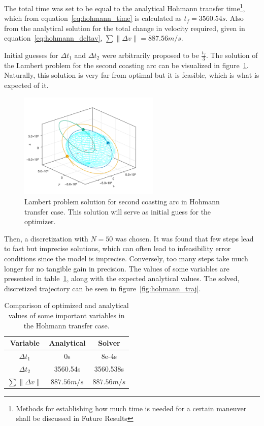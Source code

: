 The total time was set to be equal to the analytical Hohmann transfer time\footnote{Methods for establishing how much time is needed for a certain maneuver shall be discussed in Future Results}, which from equation~\eqref{eq:hohmann_time} is calculated as \(t_f = 3560.54s\). Also from the analytical solution for the total change in velocity required, given in equation~\eqref{eq:hohmann_deltav}, \(\sum \lVert \Delta v \rVert = 887.56m/s\).

Initial guesses for \(\Delta t_1\) and \(\Delta t_2\) were arbitrarily proposed to be \(\frac{t_f}{3}\). The solution of the Lambert problem for the second coasting arc can be visualized in figure~\ref{fig:hohmann_lambert}. Naturally, this solution is very far from optimal but it is feasible, which is what is expected of it.

\begin{figure}[htbp]
    \centering
    \includegraphics[width=0.6\textwidth]{img/hohmann_lambert_guess.png}
    \caption{Lambert problem solution for second coasting arc in Hohmann transfer case. This solution will serve as initial guess for the optimizer.}
    \label{fig:hohmann_lambert}
\end{figure}

Then, a discretization with \(N = 50\) was chosen. It was found that few steps lead to fast but imprecise solutions, which can often lead to infeasibility error conditions since the model is imprecise. Conversely, too many steps take much longer for no tangible gain in precision. The values of some variables are presented in table~\ref{tab:hohmann_results}, along with the expected analytical values. The solved, discretized trajectory can be seen in figure~\ref{fig:hohmann_traj}.

\begin{table}[htbp]
    \centering
    \begin{tabular}{ccc} \toprule
        Variable & Analytical & Solver \\ \midrule
        \(\Delta t_1\) & 0s & 8e-4s \\
        \(\Delta t_2\) & 3560.54s & 3560.538s \\
        \(\sum \lVert \Delta v \rVert\) & \(887.56m/s\) & \(887.56m/s\) \\ \bottomrule
    \end{tabular}
    \caption{Comparison of optimized and analytical values of some important variables in the Hohmann transfer case.}
    \label{tab:hohmann_results}
\end{table}

